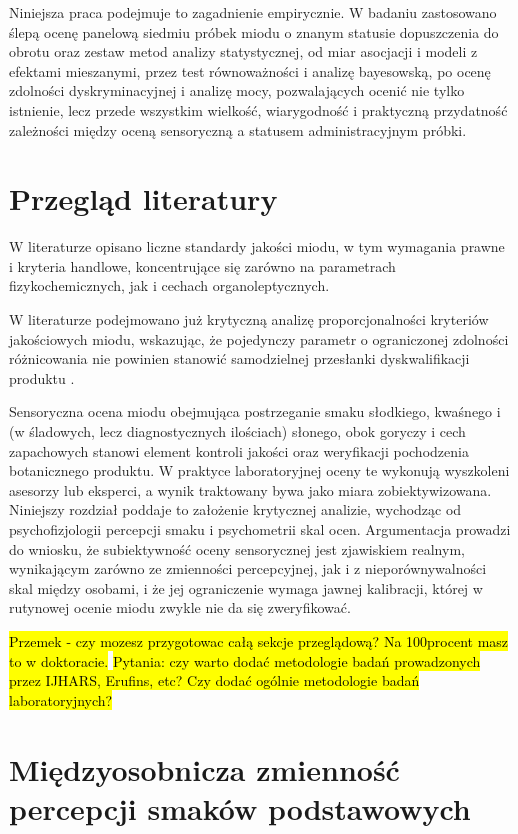 \documentclass[12pt,a4paper]{article}
\begin{document}
Niniejsza praca podejmuje to zagadnienie empirycznie. W badaniu zastosowano
ślepą ocenę panelową siedmiu próbek miodu o znanym statusie dopuszczenia do
obrotu oraz zestaw metod analizy statystycznej, od miar asocjacji i modeli
z efektami mieszanymi, przez test równoważności i analizę bayesowską, po ocenę
zdolności dyskryminacyjnej i analizę mocy, pozwalających ocenić nie tylko
istnienie, lecz przede wszystkim wielkość, wiarygodność i praktyczną
przydatność zależności między oceną sensoryczną a statusem administracyjnym
próbki.

\section{Przegląd literatury}

W literaturze opisano liczne standardy jakości miodu, w tym wymagania prawne i kryteria handlowe, 
koncentrujące się zarówno na parametrach fizykochemicznych, jak i cechach organoleptycznych.

W literaturze podejmowano już krytyczną analizę proporcjonalności kryteriów
jakościowych miodu, wskazując, że pojedynczy parametr o ograniczonej zdolności
różnicowania nie powinien stanowić samodzielnej przesłanki dyskwalifikacji
produktu \cite{Gajda2026}.

Sensoryczna ocena miodu  obejmująca postrzeganie smaku słodkiego, kwaśnego i (w śladowych,
lecz diagnostycznych ilościach) słonego, obok goryczy i cech zapachowych stanowi element
kontroli jakości oraz weryfikacji pochodzenia botanicznego produktu. W praktyce laboratoryjnej
oceny te wykonują wyszkoleni asesorzy lub eksperci, a wynik traktowany bywa jako miara
zobiektywizowana. Niniejszy rozdział poddaje to założenie krytycznej analizie, wychodząc od
psychofizjologii percepcji smaku i psychometrii skal ocen. Argumentacja prowadzi do wniosku, że
subiektywność oceny sensorycznej jest zjawiskiem realnym, wynikającym zarówno ze zmienności
percepcyjnej, jak i z nieporównywalności skal między osobami, i że jej ograniczenie wymaga
jawnej kalibracji, której w rutynowej ocenie miodu zwykle nie da się zweryfikować.
 


\hl{Przemek - czy mozesz przygotowac całą sekcje przeglądową? Na 100procent masz to w doktoracie.}
\hl{Pytania: czy warto dodać metodologie badań prowadzonych przez IJHARS, Erufins, etc? Czy dodać ogólnie metodologie badań laboratoryjnych?}




\section{Międzyosobnicza zmienność percepcji smaków podstawowych}
 
\end{document}

